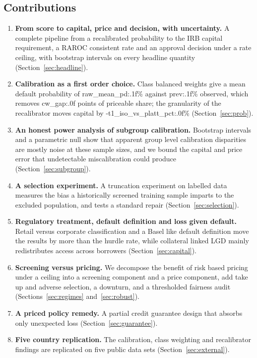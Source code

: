 \documentclass[11pt,a4paper]{article}
\begin{document}
\subsection{Contributions}
\begin{enumerate}[label=\textbf{C\arabic*.}]
\item \textbf{From score to capital, price and decision, with uncertainty.} A complete pipeline from a recalibrated probability to the IRB capital requirement, a RAROC consistent rate and an approval decision under a rate ceiling, with bootstrap intervals on every headline quantity (Section~\ref{sec:headline}).
\item \textbf{Calibration as a first order choice.} Class balanced weights give a mean default probability of {{raw_mean_pd:.1f}}\% against {{prev:.1f}}\% observed, which removes {{cw_gap:.0f}} points of priceable share; the granularity of the recalibrator moves capital by {{-t1_iso_vs_platt_pct:.0f}}\% (Section~\ref{sec:prob}).
\item \textbf{An honest power analysis of subgroup calibration.} Bootstrap intervals and a parametric null show that apparent group level calibration disparities are mostly noise at these sample sizes, and we bound the capital and price error that undetectable miscalibration could produce (Section~\ref{sec:subgroup}).
\item \textbf{A selection experiment.} A truncation experiment on labelled data measures the bias a historically screened training sample imparts to the excluded population, and tests a standard repair (Section~\ref{sec:selection}).
\item \textbf{Regulatory treatment, default definition and loss given default.} Retail versus corporate classification and a Basel like default definition move the results by more than the hurdle rate, while collateral linked LGD mainly redistributes access across borrowers (Section~\ref{sec:capital}).
\item \textbf{Screening versus pricing.} We decompose the benefit of risk based pricing under a ceiling into a screening component and a price component, add take up and adverse selection, a downturn, and a thresholded fairness audit (Sections~\ref{sec:regimes} and~\ref{sec:robust}).
\item \textbf{A priced policy remedy.} A partial credit guarantee design that absorbs only unexpected loss (Section~\ref{sec:guarantee}).
\item \textbf{Five country replication.} The calibration, class weighting and recalibrator findings are replicated on five public data sets (Section~\ref{sec:external}).
\end{enumerate}
\end{document}
